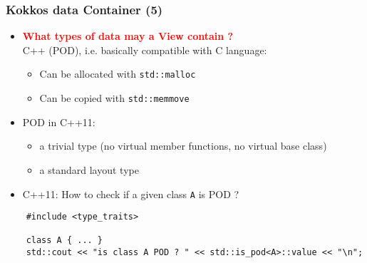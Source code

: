 \begin{frame}[fragile=singleslide]
  \frametitle{Kokkos data Container (5)}

  \begin{itemize}
  \item \textcolor{red}{\textbf{What types of data may a View contain ?}}\\
    C++  (POD), i.e. basically compatible with C language:
    \begin{itemize}
    \item Can be allocated with \texttt{std::malloc}
    \item Can be copied with \texttt{std::memmove}
    \end{itemize}
  \item POD in C++11: 
    \begin{itemize}
    \item a trivial type (no virtual member functions, no virtual base class)
    \item a standard layout type
    \end{itemize}
  \item C++11: How to check if a given class \texttt{A} is POD ?
  \end{itemize}
  \begin{verbatim}
    #include <type_traits>
    
    class A { ... }
    std::cout << "is class A POD ? " << std::is_pod<A>::value << "\n";
  \end{verbatim}
  
\end{frame}

